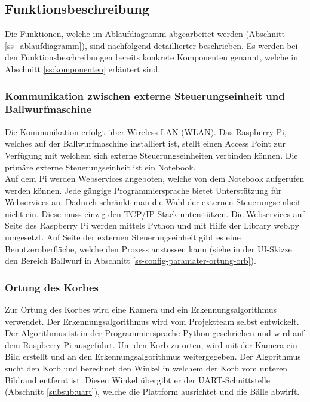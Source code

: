 \subsection{Funktionsbeschreibung}
Die Funktionen, welche im Ablaufdiagramm abgearbeitet werden (Abschnitt \ref{ss_ablaufdiagramm}), sind nachfolgend detaillierter beschrieben. Es werden bei den Funktionsbeschreibungen bereits konkrete Komponenten genannt, welche in Abschnitt \ref{ss:komponenten} erläutert sind.

\subsubsection{Kommunikation zwischen externe Steuerungseinheit und Ballwurfmaschine}
Die Kommunikation erfolgt über Wireless LAN (WLAN). Das Raspberry Pi, welches auf der Ballwurfmaschine installiert ist, stellt einen Access Point zur Verfügung mit welchem sich externe Steuerungseinheiten verbinden können. Die primäre externe Steuerungseinheit ist ein Notebook.\\
Auf dem Pi werden Webservices angeboten, welche von dem Notebook aufgerufen werden können. Jede gängige Programmiersprache bietet Unterstützung für Webservices an. Dadurch schränkt man die Wahl der externen Steuerungseinheit nicht ein. Diese muss einzig den TCP/IP-Stack unterstützen. Die Webservices auf Seite des Raspberry Pi werden mittels Python und mit Hilfe der Library web.py umgesetzt. Auf Seite der externen Steuerungseinheit gibt es eine Benutzeroberfläche, welche den Prozess anstossen kann (siehe in der UI-Skizze den Bereich Ballwurf in Abschnitt
\ref{ss-config-paramater-ortung-orb}).

\subsubsection{Ortung des Korbes}
Zur Ortung des Korbes wird eine Kamera und ein Erkennungsalgorithmus verwendet. Der Erkennungsalgorithmus wird vom Projektteam selbst entwickelt. Der Algorithmus ist in der Programmiersprache Python geschrieben und wird auf dem Raspberry Pi ausgeführt. Um den Korb zu orten, wird mit der Kamera ein Bild erstellt und an den Erkennungsalgorithmus weitergegeben. Der Algorithmus sucht den Korb und berechnet den Winkel in welchem der Korb vom unteren Bildrand entfernt ist. Diesen Winkel übergibt er der UART-Schnittstelle (Abschnitt \ref{subsub:uart}), welche die Plattform ausrichtet und die Bälle abwirft.

